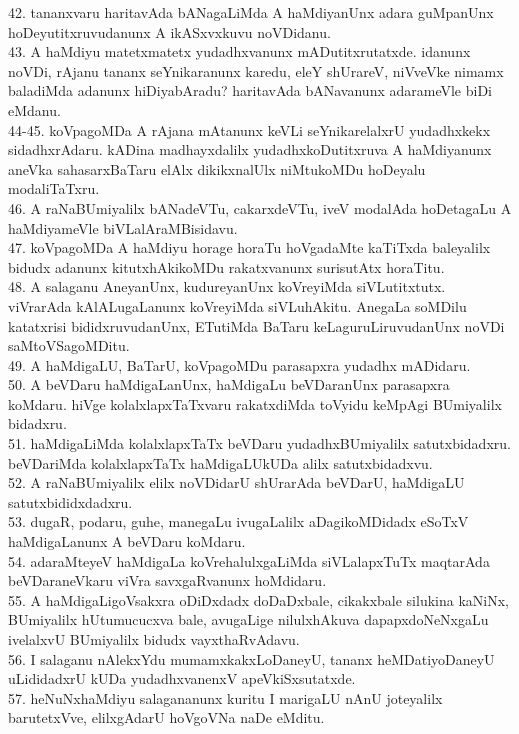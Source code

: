 \documentclass{article}
\begin{document}
42. tananxvaru haritavAda bANagaLiMda A haMdiyanUnx adara guMpanUnx hoDeyutitxruvudanunx A ikASxvxkuvu noVDidanu.\\
43. A haMdiyu matetxmatetx yudadhxvanunx mADutitxrutatxde. idanunx noVDi, rAjanu tananx seYnikaranunx karedu, eleY shUrareV, niVveVke nimamx baladiMda adanunx hiDiyabAradu? haritavAda bANavanunx adarameVle biDi eMdanu.\\
44-45. koVpagoMDa A rAjana mAtanunx keVLi seYnikarelalxrU yudadhxkekx sidadhxrAdaru. kADina madhayxdalilx yudadhxkoDutitxruva A haMdiyanunx aneVka sahasarxBaTaru elAlx dikikxnalUlx niMtukoMDu hoDeyalu modaliTaTxru.\\
46. A raNaBUmiyalilx bANadeVTu, cakarxdeVTu, iveV modalAda hoDetagaLu A haMdiyameVle biVLalAraMBisidavu.\\
47. koVpagoMDa A haMdiyu horage horaTu hoVgadaMte kaTiTxda baleyalilx bidudx adanunx kitutxhAkikoMDu rakatxvanunx surisutAtx horaTitu.\\
48. A salaganu AneyanUnx, kudureyanUnx koVreyiMda siVLutitxtutx. viVrarAda kAlALugaLanunx koVreyiMda siVLuhAkitu. AnegaLa soMDilu katatxrisi bididxruvudanUnx, ETutiMda BaTaru keLaguruLiruvudanUnx noVDi saMtoVSagoMDitu.\\
49. A haMdigaLU, BaTarU, koVpagoMDu parasapxra yudadhx mADidaru.\\
50. A beVDaru haMdigaLanUnx, haMdigaLu beVDaranUnx parasapxra koMdaru. hiVge kolalxlapxTaTxvaru rakatxdiMda toVyidu keMpAgi BUmiyalilx bidadxru.\\
51. haMdigaLiMda kolalxlapxTaTx beVDaru yudadhxBUmiyalilx satutxbidadxru. beVDariMda kolalxlapxTaTx haMdigaLUkUDa alilx satutxbidadxvu.\\
52. A raNaBUmiyalilx elilx noVDidarU shUrarAda beVDarU, haMdigaLU satutxbididxdadxru.\\
53. dugaR, podaru, guhe, manegaLu ivugaLalilx aDagikoMDidadx eSoTxV haMdigaLanunx A beVDaru koMdaru.\\
54. adaraMteyeV haMdigaLa koVrehalulxgaLiMda siVLalapxTuTx maqtarAda beVDaraneVkaru viVra savxgaRvanunx hoMdidaru.\\
55. A haMdigaLigoVsakxra oDiDxdadx doDaDxbale, cikakxbale silukina kaNiNx, BUmiyalilx hUtumucucxva bale, avugaLige nilulxhAkuva dapapxdoNeNxgaLu ivelalxvU BUmiyalilx bidudx vayxthaRvAdavu.\\
56. I salaganu nAlekxYdu mumamxkakxLoDaneyU, tananx heMDatiyoDaneyU uLididadxrU kUDa yudadhxvanenxV apeVkiSxsutatxde.\\
57. heNuNxhaMdiyu salagananunx kuritu I marigaLU nAnU joteyalilx barutetxVve, elilxgAdarU hoVgoVNa naDe eMditu.\\
\end{document}
